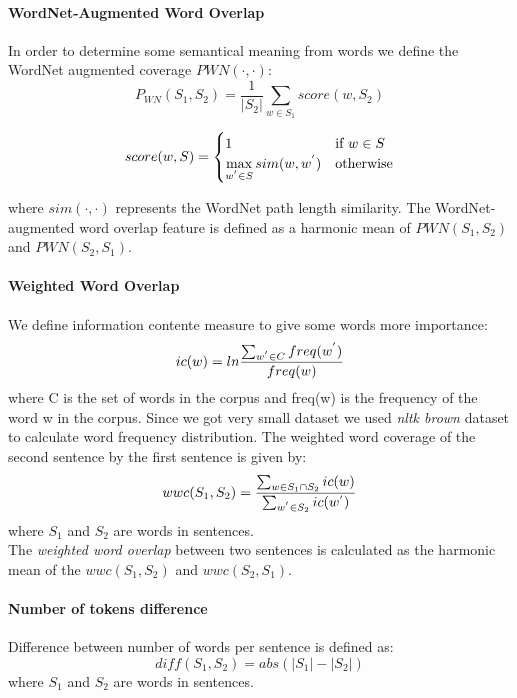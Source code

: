 \documentclass[10pt, a4paper]{article}
\begin{document}
\begin{table}[h!]
\paragraph{WordNet-Augmented Word Overlap \\}
In order to determine some semantical meaning from words we define the WordNet augmented coverage $ PWN(\cdot, \cdot) $:
\begin{equation}\label{eq:pwn}
P_{WN}(S_1, S_2) = \frac{1}{|S_2|} \sum_{w \in S_1} score(w, S_2)
\end{equation}

\begin{equation}\label{eq:pwn-score}
score(w, S) = \begin{cases}
1 & \text{if $w \in S $}\\
\max\limits_{w^{\rq} \in S} sim(w, w^{\rq}) & \text{otherwise}
\end{cases}
\end{equation}

where $sim(\cdot, \cdot)$ represents the WordNet path length
similarity. The WordNet-augmented word overlap
feature is defined as a harmonic mean of
$PWN(S_1, S_2)$ and $PWN(S_2, S_1)$.\citep{Saric2012TakeLabSF}


\paragraph{Weighted Word Overlap \\}
We define information contente measure to give some words more importance:
\begin{equation}\label{eq:inf-content}
ic(w) = ln \frac{\sum_{w^{\rq} \in C} freq(w^{\rq}) }{freq(w)}
\end{equation}
where C is the set of words in the corpus and
freq(w) is the frequency of the word w in the corpus. Since we got very small dataset we used \emph{nltk brown} dataset to calculate word frequency distribution.
The weighted word coverage of the second sentence by the first sentence is given by:
\begin{equation}\label{eq:wwc}
wwc(S_1, S_2) = \frac{\sum_{w \in S_1 \cap S_2} ic(w)}{\sum_{w^{\rq} \in S_2} ic(w^{\rq})}
\end{equation}
where $S_1$ and $S_2$ are words in sentences.\\
The \emph{weighted word overlap} between two sentences
is calculated as the harmonic mean of the
$wwc(S_1, S_2)$ and $wwc(S_2, S_1)$.\citep{Saric2012TakeLabSF}

\paragraph{Number of tokens difference \\}
Difference between number of words per sentence is defined as:
\begin{equation}\label{eq:word-diff}
diff(S_1, S_2) = abs(|S_1| - |S_2|)
\end{equation}
where $S_1$ and $S_2$ are words in sentences.

\end{table}
\end{document}

